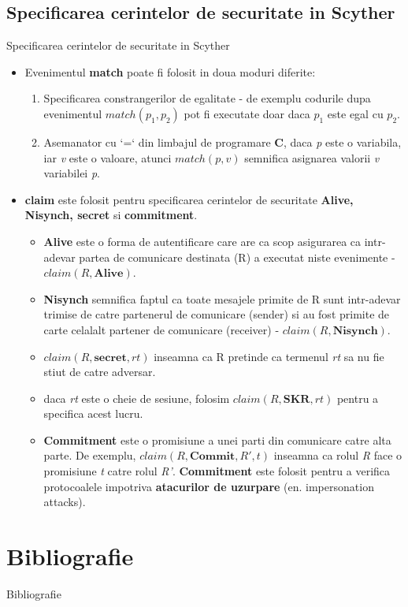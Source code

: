 \documentclass[11pt]{beamer}
\begin{document}
\subsection{Specificarea cerintelor de securitate in Scyther}
\begin{frame}[t,allowframebreaks]{Specificarea cerintelor de securitate in Scyther}

\begin{itemize}

\item Evenimentul \textbf{match} poate fi folosit in doua moduri diferite:

	\begin{enumerate}

	\item Specificarea constrangerilor de egalitate - de exemplu codurile dupa evenimentul $match(p_1, p_2)$ pot fi executate doar daca $p_1$ este egal cu $p_2$.
	\item Asemanator cu `=` din limbajul de programare \textbf{C}, daca \textit{p} este o variabila, iar \textit{v} este o valoare, atunci $match(p, v)$ semnifica asignarea valorii \textit{v} variabilei \textit{p}.
	
	\end{enumerate}
	
\item \textbf{claim} este folosit pentru specificarea cerintelor de securitate \textbf{Alive, Nisynch, secret} si \textbf{commitment}.
	\begin{itemize}

	\item \textbf{Alive} este o forma de autentificare care are ca scop asigurarea ca intr-adevar partea de comunicare destinata (R) a executat niste evenimente - $claim(R,\textbf{Alive})$.
	
	\item \textbf{Nisynch} semnifica faptul ca toate mesajele primite de R sunt intr-adevar trimise de catre partenerul de comunicare (sender) si au fost primite de carte celalalt partener de comunicare (receiver) - $claim(R,\textbf{Nisynch})$.
	
	\item $claim(R, \textbf{secret}, rt)$ inseamna ca R pretinde ca termenul \textit{rt} sa nu fie stiut de catre adversar.
	
	\item daca \textit{rt} este o cheie de sesiune, folosim $claim(R,\textbf{SKR}, rt)$ pentru a specifica acest lucru.
	
	\item \textbf{Commitment} este o promisiune a unei parti din comunicare catre alta parte. De exemplu, $claim(R,\textbf{Commit}, R', t)$ inseamna ca rolul \textit{R} face o promisiune \textit{t} catre rolul \textit{R'}. \textbf{Commitment} este folosit pentru a verifica protocoalele impotriva \textbf{atacurilor de uzurpare} (en. impersonation attacks).
	
	\end{itemize}

\end{itemize}

\end{frame}

\section{Bibliografie}
\begin{frame}{Bibliografie}
\printbibliography
\end{frame}
\end{document}
